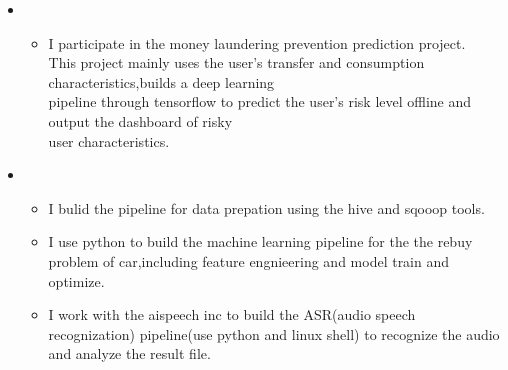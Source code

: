   \begin{itemize}[leftmargin=*]
    \item
           {\small
      \begin{itemize}
      \item I participate in the money laundering prevention prediction project.\\This project mainly uses the user's transfer and consumption characteristics,builds a deep learning\\ pipeline through tensorflow to predict the user's risk level offline and output the dashboard of risky \\user characteristics.
	  
            \end{itemize}
}


    \item
           {\small
      \begin{itemize}
      \item I bulid the pipeline for  data prepation using the hive and sqooop tools.
      \item I use python to build the machine learning pipeline for the the rebuy problem of car,including feature engnieering and model train and optimize.
	  \item I work with the aispeech inc to build the ASR(audio speech recognization) pipeline(use python and linux shell) to recognize the audio and analyze the result file. 
            \end{itemize}

             }
    
 \end{itemize}
    
